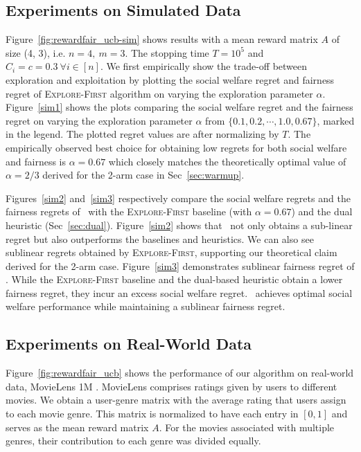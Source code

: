 \subsection{Experiments on Simulated Data} 
Figure~\ref{fig:rewardfair_ucb-sim} shows results with a mean reward matrix $A$ of size (4, 3), i.e. $n=4, \ m=3$. The stopping time $T=10^5$ and $C_i=c=0.3\ \forall i\in [n]$. We first empirically show the trade-off between exploration and exploitation by plotting the social welfare regret and fairness regret of \textsc{Explore-First} algorithm on varying the exploration parameter $\alpha$. Figure~\ref{sim1} shows the plots comparing the social welfare regret and the fairness regret on varying the exploration parameter $\alpha$ from $\{0.1, 0.2, \cdots, 1.0, 0.67\}$, marked in the legend. The plotted regret values are after normalizing by $T$. The empirically observed best choice for obtaining low regrets for both social welfare and fairness is $\alpha=0.67$ which closely matches the theoretically optimal value of $\alpha=2/3$ derived for the 2-arm case in Sec~\ref{sec:warmup}. 

Figures~\ref{sim2} and~\ref{sim3} respectively compare the social welfare regrets and the fairness regrets of \ouralgo \ with the \textsc{Explore-First} baseline (with $\alpha=0.67$) and the dual heuristic (Sec~\ref{sec:dual}). Figure~\ref{sim2} shows that \ouralgo\ not only obtains a sub-linear regret but also outperforms the baselines and heuristics. We can also see sublinear regrets obtained by \textsc{Explore-First}, supporting our theoretical claim derived for the 2-arm case. Figure~\ref{sim3} demonstrates sublinear fairness regret of \ouralgo. While the \textsc{Explore-First} baseline and the dual-based heuristic obtain a lower fairness regret, they incur an excess social welfare regret. \ouralgo\ achieves optimal social welfare performance while maintaining a sublinear fairness regret.

\subsection{Experiments on Real-World Data}
Figure~\ref{fig:rewardfair_ucb} shows the performance of our algorithm on real-world data, MovieLens 1M \cite{10.1145/2827872}. MovieLens comprises ratings given by users to different movies. We obtain a user-genre matrix with the average rating that users assign to each movie genre. This matrix is normalized to have each entry in $[0, 1]$ and serves as the mean reward matrix $A$. For the movies associated with multiple genres, their contribution to each genre was divided equally. 

